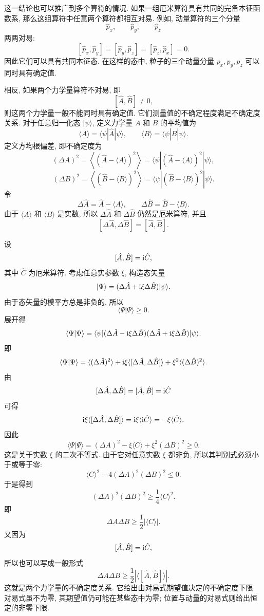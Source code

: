 这一结论也可以推广到多个算符的情况. 如果一组厄米算符具有共同的完备本征函数系, 那么这组算符中任意两个算符都相互对易. 例如, 动量算符的三个分量
\[
\hat p_x, \qquad \hat p_y, \qquad \hat p_z
\]
两两对易:
\[
[\hat p_x, \hat p_y]=[\hat p_y, \hat p_z]=[\hat p_z, \hat p_x]=0.
\]
因此它们可以具有共同本征态. 在这样的态中, 粒子的三个动量分量 $p_x, p_y, p_z$ 可以同时具有确定值.

相反, 如果两个力学量算符不对易, 即
\[
[\hat A, \hat B]\neq 0,
\]
则这两个力学量一般不能同时具有确定值. 它们测量值的不确定程度满足不确定度关系. 对于任意归一化态 $|\psi\rangle$, 定义力学量 $A$ 和 $B$ 的平均值为
\[
\langle A\rangle=\langle \psi|\hat A|\psi\rangle,
\qquad
\langle B\rangle=\langle \psi|\hat B|\psi\rangle.
\]
定义方均根偏差, 即不确定度为
\[
(\Delta A)^2
=
\left\langle
(\hat A-\langle A\rangle)^2
\right\rangle
=
\langle \psi|
(\hat A-\langle A\rangle)^2
|\psi\rangle,
\]
\[
(\Delta B)^2
=
\left\langle
(\hat B-\langle B\rangle)^2
\right\rangle
=
\langle \psi|
(\hat B-\langle B\rangle)^2
|\psi\rangle.
\]
令
\[
\Delta \hat A=\hat A-\langle A\rangle, \qquad
\Delta \hat B=\hat B-\langle B\rangle.
\]
由于 $\langle A\rangle$ 和 $\langle B\rangle$ 是实数, 所以 $\Delta\hat A$ 和 $\Delta\hat B$ 仍然是厄米算符, 并且
\[
[\Delta\hat A, \Delta\hat B]=[\hat A, \hat B].
\]

设
\[
[\hat A, \hat B]=\mathop{}\!\mathrm{i}\hat C,
\]
其中 $\hat C$ 为厄米算符. 考虑任意实参数 $\xi$, 构造态矢量
\[
|\Psi\rangle=(\Delta\hat A+\mathop{}\!\mathrm{i}\xi\Delta\hat B)|\psi\rangle.
\]
由于态矢量的模平方总是非负的, 所以
\[
\langle \Psi|\Psi\rangle\geq 0.
\]
展开得
\[
\langle \Psi|\Psi\rangle
=
\langle \psi|
(\Delta\hat A-\mathop{}\!\mathrm{i}\xi\Delta\hat B)
(\Delta\hat A+\mathop{}\!\mathrm{i}\xi\Delta\hat B)
|\psi\rangle.
\]
即
\[
\langle \Psi|\Psi\rangle
=
\langle (\Delta\hat A)^2\rangle
+ \mathop{}\!\mathrm{i}\xi\langle[\Delta\hat A, \Delta\hat B]\rangle
+\xi^2\langle(\Delta\hat B)^2\rangle.
\]
由
\[
[\Delta\hat A, \Delta\hat B]=[\hat A, \hat B]=\mathop{}\!\mathrm{i}\hat C
\]
可得
\[
\mathop{}\!\mathrm{i}\xi\langle[\Delta\hat A, \Delta\hat B]\rangle
=
\mathop{}\!\mathrm{i}\xi\langle \mathop{}\!\mathrm{i}\hat C\rangle
=
-\xi\langle \hat C\rangle.
\]
因此
\[
\langle \Psi|\Psi\rangle
=
(\Delta A)^2
-\xi\langle C\rangle
+\xi^2(\Delta B)^2
\geq 0.
\]
这是关于实数 $\xi$ 的二次不等式. 由于它对任意实数 $\xi$ 都非负, 所以其判别式必须小于或等于零:
\[
\langle C\rangle^2
-
4(\Delta A)^2(\Delta B)^2
\leq 0.
\]
于是得到
\[
(\Delta A)^2(\Delta B)^2
\geq
\frac{1}{4}\langle C\rangle^2.
\]
即
\[
\Delta A\Delta B
\geq
\frac{1}{2}|\langle C\rangle|.
\]
又因为
\[
[\hat A, \hat B]=\mathop{}\!\mathrm{i}\hat C,
\]
所以也可以写成一般形式
\[
\Delta A\Delta B
\geq
\frac{1}{2}
\left|
\langle[\hat A, \hat B]\rangle
\right|.
\]
这就是两个力学量的不确定度关系. 它给出由对易式期望值决定的不确定度下限. 对易式虽不为零, 其期望值仍可能在某些态中为零; 位置与动量的对易式则给出恒定的非零下限.

